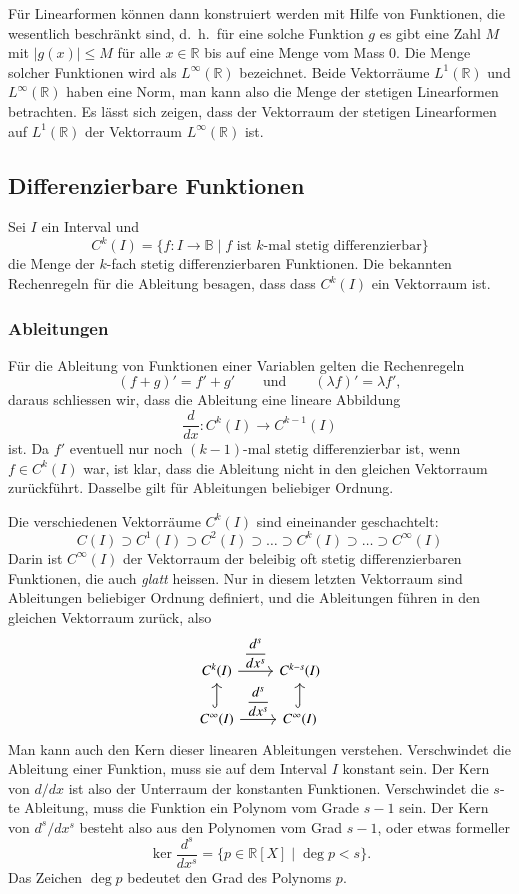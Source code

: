 Für Linearformen können dann konstruiert werden mit Hilfe von 
Funktionen, die wesentlich beschränkt sind, d.~h.~für eine solche
Funktion $g$ es gibt eine Zahl $M$ mit $|g(x)|\le M$ für alle
$x\in\mathbb R$ bis auf eine Menge vom Mass $0$.
Die Menge solcher Funktionen wird als $L^\infty(\mathbb R)$ 
bezeichnet.
Beide Vektorräume $L^1(\mathbb R)$ und $L^\infty(\mathbb R)$
haben eine Norm, man kann also die Menge der stetigen Linearformen
betrachten.
Es lässt sich zeigen, dass der Vektorraum der stetigen Linearformen
auf $L^1(\mathbb R)$ der Vektorraum $L^\infty(\mathbb R)$ ist.


\subsection{Differenzierbare Funktionen}
Sei $I$ ein Interval und 
\[
C^k(I)
=
\{
f\colon I\to\mathbb B\;|\;
\text{$f$ ist $k$-mal stetig differenzierbar}
\}
\]
die Menge der $k$-fach stetig differenzierbaren Funktionen.
Die bekannten Rechenregeln für die Ableitung besagen, dass
dass $C^k(I)$ ein Vektorraum ist.

\subsubsection{Ableitungen}
Für die Ableitung von Funktionen einer Variablen gelten die
Rechenregeln
\[
(f+g)'=f'+g'
\qquad\text{und}\qquad
(\lambda f)' = \lambda f',
\]
daraus schliessen wir, dass die Ableitung eine lineare Abbildung
\[
\frac{d}{dx} \colon C^k(I)\to C^{k-1}(I)
\]
ist.
Da $f'$ eventuell nur noch $(k-1)$-mal stetig differenzierbar ist, wenn
$f\in C^k(I)$ war, ist klar, dass die Ableitung nicht in den gleichen
Vektorraum zurückführt.
Dasselbe gilt für Ableitungen beliebiger Ordnung.

Die verschiedenen Vektorräume $C^k(I)$ sind eineinander
geschachtelt:
\[
C(I) \supset C^1(I) \supset C^2(I)\supset \dots \supset
C^k(I) \supset \dots \supset C^\infty(I)
\]
Darin ist $C^\infty(I)$ der Vektorraum der beleibig oft stetig
differenzierbaren Funktionen, die auch {\em glatt} heissen.
%
Nur in diesem letzten Vektorraum sind Ableitungen beliebiger Ordnung
definiert, und die Ableitungen führen in den gleichen Vektorraum zurück,
also
\[
\begin{tikzcd}
C^k(I) \ar[r,"\displaystyle\frac{d^s}{dx^s}"]
	& C^{k-s}(I)
\\
C^\infty(I) \ar[r,"\displaystyle\frac{d^s}{dx^s}"] \ar[u,hook]
	&C^\infty(I) \ar[u,hook]
\end{tikzcd}
\]
Man kann auch den Kern dieser linearen Ableitungen verstehen.
Verschwindet die Ableitung einer Funktion, muss sie auf dem Interval
$I$ konstant sein.
Der Kern von $d/dx$ ist also der Unterraum der konstanten Funktionen.
Verschwindet die $s$-te Ableitung, muss die Funktion ein Polynom
vom Grade $s-1$ sein.
Der Kern von $d^s/dx^s$ besteht also aus den Polynomen vom Grad $s-1$,
oder etwas formeller
\[
\operatorname{ker}\frac{d^s}{dx^s} = \{ p\in \mathbb R[X]\;|\; \deg p < s\}.
\]
Das Zeichen $\deg p$ bedeutet den Grad des Polynoms $p$.

